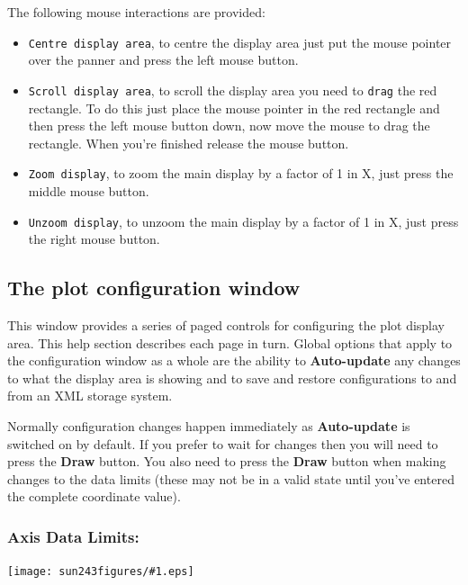 \documentclass[twoside,11pt]{article}
\newcommand{\htmladdimg}[1]{}
\newcommand{\latexhtml}[2]{#1}
\renewcommand{\_}{\texttt{\symbol{95}}}
\newcommand{\mainfigure}[1]
{\begin{center}
 \latexhtml{\texttt{[image: sun243\_figures/\#1.eps]}}{\htmladdimg{#1.gif}}
 \end{center}
}
\newcommand{\labelitem}[1]{\textbf{#1}}
\newcommand{\hitext}[1]{\texttt{#1}}
\begin{document}
The following mouse interactions are provided:
\begin{itemize}

 \item \hitext{Centre display area}, to centre the display area just
 put the mouse pointer over the panner and press the left mouse
 button.

 \item \hitext{Scroll display area}, to scroll the display area you
 need to \hitext{drag} the red rectangle. To do this just place the
 mouse pointer in the red rectangle and then press the left mouse
 button down, now move the mouse to drag the rectangle. When you're
 finished release the mouse button.

 \item \hitext{Zoom display}, to zoom the main display by a factor of
 1 in X, just press the middle mouse button.

 \item \hitext{Unzoom display}, to unzoom the main display by a factor
 of 1 in X, just press the right mouse button.

\end{itemize}

\newpage
\subsection{The plot configuration window}

This window provides a series of paged controls for configuring the
plot display area. This help section describes each page in
turn. Global options that apply to the configuration window as a whole
are the ability to \labelitem{Auto-update} any changes to what the
display area is showing and to save and restore configurations to and
from an XML storage system.

Normally configuration changes happen immediately as \labelitem{Auto-update}
is switched on by default. If you prefer to wait for changes then you will
need to press the \labelitem{Draw} button. You also need to press the
\labelitem{Draw} button when making changes to the data limits (these may not
be in a valid state until you've entered the complete coordinate value).

\newpage
\subsubsection*{Axis Data Limits:}

\mainfigure{configurewindowlimits}
\end{document}
